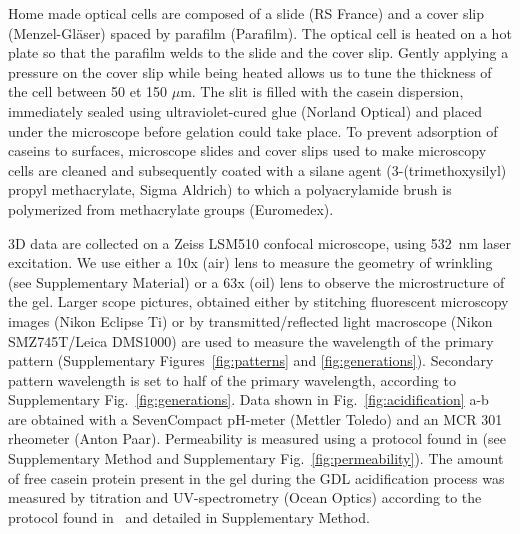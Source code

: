 \documentclass[twocolumn,superscriptaddress,showpacs,preprintnumbers,
amsmath,amssymb,prl]{revtex4-1}
\begin{document}
Home made optical cells are composed of a slide (RS France) and a cover slip (Menzel-Gl\"aser) spaced by parafilm (Parafilm). The optical cell is heated  on a hot plate so that the parafilm welds to the  slide and the cover slip. Gently applying a pressure on the cover slip while being heated allows us to tune the thickness of the cell between 50 et 150 $\mu$m. The slit is filled with the casein dispersion, immediately sealed using ultraviolet-cured glue (Norland Optical) and placed under the microscope before gelation could take place. To prevent adsorption of caseins to surfaces, microscope slides and cover slips used to make microscopy cells are cleaned and subsequently coated with a silane agent (3-(trimethoxysilyl) propyl methacrylate, Sigma Aldrich) to which a polyacrylamide brush is polymerized from methacrylate groups (Euromedex).

3D data are collected on a Zeiss LSM510 confocal microscope, using \SI{532}{\nano\meter} laser excitation. We use either a 10x (air) lens to measure the geometry of wrinkling (see Supplementary Material) or a 63x (oil) lens to observe the microstructure of the gel. Larger scope pictures, obtained either by stitching fluorescent microscopy images (Nikon Eclipse Ti) or by transmitted/reflected light macroscope (Nikon SMZ745T/Leica DMS1000) are used to measure the wavelength of the primary pattern (Supplementary Figures~\ref{fig:patterns} and \ref{fig:generations}). Secondary pattern wavelength is set to half of the primary wavelength, according to Supplementary Fig.~\ref{fig:generations}.
Data shown in Fig.~\ref{fig:acidification} a-b are obtained with a SevenCompact pH-meter (Mettler Toledo) and an MCR 301 rheometer (Anton Paar).
Permeability is measured using a protocol found in \cite{VanDijk1986} (see Supplementary Method and Supplementary Fig.~\ref{fig:permeability}). The amount of free casein protein present in the gel during the GDL acidification process was measured by titration and UV-spectrometry (Ocean Optics) according to the protocol found in~\cite{Roefs1986} and detailed in Supplementary Method.



\end{document}
